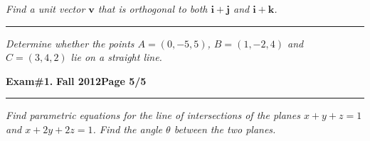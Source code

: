 \documentclass[12pt]{article}
\begin{document}
\bigskip
{\problem[15 pts] \em Find a unit vector $\boldsymbol{v}$ that is orthogonal
to both $\boldsymbol{i} + \boldsymbol{j}$ and $\boldsymbol{i} +
\boldsymbol{k}$.} 
\vspace{11cm}
\begin{flushright}
\end{flushright}
\hrule
{\problem[10 pts] \em Determine whether the points $A=(0,-5,5)$, $ B=
(1,-2,4)$ and $C=(3,4,2)$ lie on a straight line.}
\newpage

\hfill{\large\bf Exam\#1.}\hfill{\large\bf
  Fall 2012}\hfill{\large\bf Page 5/5}\hrule

\bigskip
{\problem[20 pts] \em Find parametric equations for the line of intersections
of the planes $x+y+z=1$ and $x+2y+2z=1$.  Find the angle $\theta$ between the
two planes.}
\vspace{18.5cm}
\begin{flushright}
\end{flushright}
\end{document}
